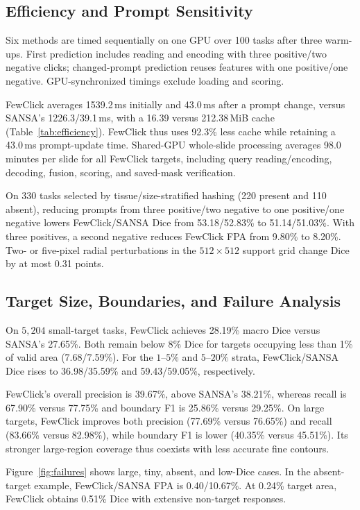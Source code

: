 \subsection{Efficiency and Prompt Sensitivity}

Six methods are timed sequentially on one GPU over 100 tasks after three warm-ups. First prediction includes reading and encoding with three positive/two negative clicks; changed-prompt prediction reuses features with one positive/one negative. GPU-synchronized timings exclude loading and scoring.

FewClick averages 1539.2\,ms initially and 43.0\,ms after a prompt change, versus SANSA's 1226.3/39.1\,ms, with a 16.39 versus 212.38\,MiB cache (Table~\ref{tab:efficiency}). FewClick thus uses 92.3\% less cache while retaining a 43.0\,ms prompt-update time. Shared-GPU whole-slide processing averages 98.0 minutes per slide for all FewClick targets, including query reading/encoding, decoding, fusion, scoring, and saved-mask verification.

On 330 tasks selected by tissue/size-stratified hashing (220 present and 110 absent), reducing prompts from three positive/two negative to one positive/one negative lowers FewClick/SANSA Dice from 53.18/52.83\% to 51.14/51.03\%. With three positives, a second negative reduces FewClick FPA from 9.80\% to 8.20\%. Two- or five-pixel radial perturbations in the $512\times512$ support grid change Dice by at most 0.31 points.

\subsection{Target Size, Boundaries, and Failure Analysis}

On $5{,}204$ small-target tasks, FewClick achieves 28.19\% macro Dice versus SANSA's 27.65\%. Both remain below 8\% Dice for targets occupying less than 1\% of valid area (7.68/7.59\%). For the $1$--$5\%$ and $5$--$20\%$ strata, FewClick/SANSA Dice rises to 36.98/35.59\% and 59.43/59.05\%, respectively.

FewClick's overall precision is 39.67\%, above SANSA's 38.21\%, whereas recall is 67.90\% versus 77.75\% and boundary F1 is 25.86\% versus 29.25\%. On large targets, FewClick improves both precision (77.69\% versus 76.65\%) and recall (83.66\% versus 82.98\%), while boundary F1 is lower (40.35\% versus 45.51\%). Its stronger large-region coverage thus coexists with less accurate fine contours.

Figure~\ref{fig:failures} shows large, tiny, absent, and low-Dice cases. In the absent-target example, FewClick/SANSA FPA is 0.40/10.67\%. At 0.24\% target area, FewClick obtains 0.51\% Dice with extensive non-target responses.
